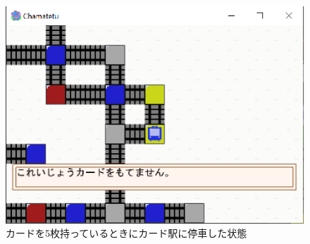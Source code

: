 \documentclass[a4j]{jarticle}
\begin{document}
    \begin{figure}[H]
        \centering
        \includegraphics[scale=1.3]{motenai.eps}
        \caption{カードを5枚持っているときにカード駅に停車した状態}
         \label{motenai}
        \end{figure}
\end{document}
